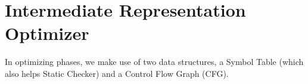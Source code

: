 \section{Intermediate Representation Optimizer}
In optimizing phases, we make use of two data structures, a Symbol Table (which also helps Static Checker) and a Control Flow Graph (CFG).